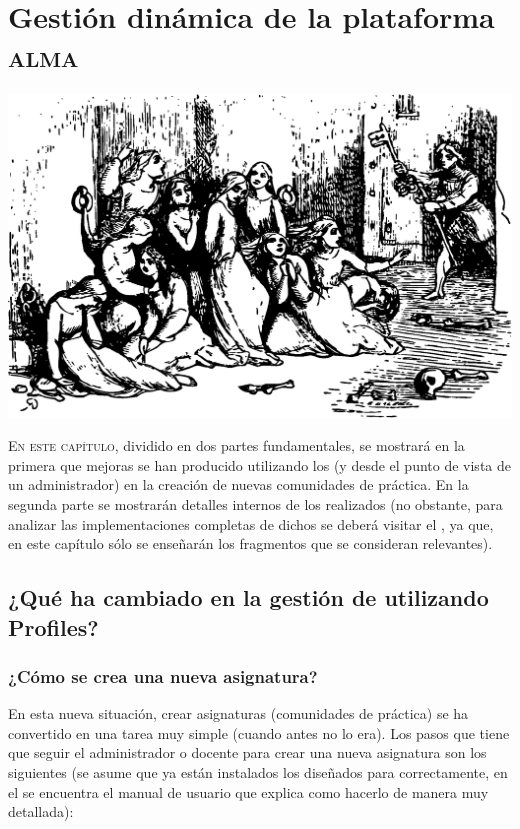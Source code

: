 \chapter{Gestión dinámica de la plataforma \textsc{alma}} 
\label{chapter:gestion-dinamica}

\begin{center}
\includegraphics[scale=0.4]{../graphics/johnny_automatic_Jack_freeth_the_captives.eps}
\end{center}

\lettrine{E}{n este capítulo}, dividido en dos partes fundamentales, se mostrará en la primera que mejoras se han producido utilizando los \profiles{} (y desde el punto de vista de un administrador) en la creación de nuevas comunidades de práctica. En la segunda parte se mostrarán detalles internos de los \profiles{} realizados (no obstante, para analizar las implementaciones completas de dichos \profiles{} se deberá visitar el , ya que, en este capítulo sólo se enseñarán los fragmentos que se consideran relevantes).

\section{¿Qué ha cambiado en la gestión de \tiki{} utilizando Profiles?}

\subsection{¿Cómo se crea una nueva asignatura?}

En esta nueva situación, crear asignaturas (comunidades de práctica) se ha convertido en una tarea muy simple (cuando antes no lo era). Los pasos que tiene que seguir el administrador o docente para crear una nueva asignatura son los siguientes (se asume que ya están instalados los \profiles{} diseñados para \alma{} correctamente, en el  se encuentra el manual de usuario que explica como hacerlo de manera muy detallada):

